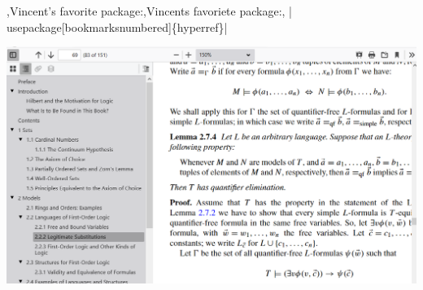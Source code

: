 
\begin{frame}{%
    \lang,Vincent's favorite package:,Vincents favoriete package:, \hll|\\usepackage[bookmarksnumbered]\{hyperref\}|}

\includegraphics[height=0.8\textheight,width=\linewidth,keepaspectratio]{assets/hyperref2.png}

\end{frame}

